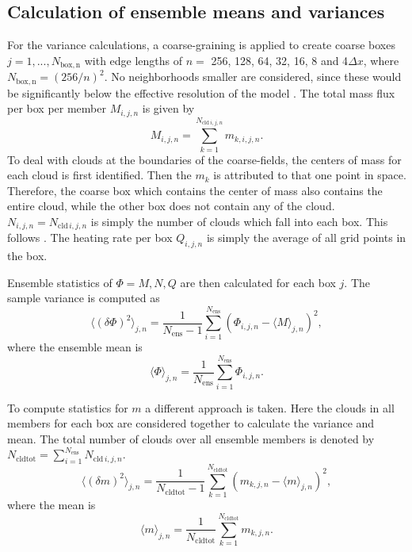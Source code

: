 \documentclass[a4paper, 12pt]{article}
\begin{document}
\subsection{Calculation of ensemble means and variances}
For the variance calculations, a coarse-graining is applied to create coarse boxes $j=1,...,N_{\mathrm{box,n}}$ with edge lengths of $n=$ 256, 128, 64, 32, 16, 8 and 4$\Delta x$, where $N_{\mathrm{box,n}}=(256/n)^2$. No neighborhoods smaller are considered, since these would be significantly below the effective resolution of the model \citep{Skamarock2004}. The total mass flux per box per member $M_{i,j,n}$ is given by
\begin{equation} \label{eq:calc_memM}
 M_{i,j,n} = \sum_{k=1}^{N_{\mathrm{cld}\,i,j,n}} m_{k,i,j,n}.
\end{equation}
To deal with clouds at the boundaries of the coarse-fields, the centers of mass for each cloud is first identified. Then the $m_k$ is attributed to that one point in space. Therefore, the coarse box which contains the center of mass also contains the entire cloud, while the other box does not contain any of the cloud. $N_{i,j,n}=N_{\mathrm{cld}\,i,j,n}$ is simply the number of clouds which fall into each box. This follows \cite{Cohen2006}. The heating rate per box $Q_{i,j,n}$ is simply the average of all grid points in the box.

Ensemble statistics of $\Phi = M, N, Q$ are then calculated for each box $j$. The sample variance is computed as
\begin{equation} \label{eq:calc_varM}
 \langle (\delta \Phi )^2 \rangle_{j,n} = \frac{1}{N_{\mathrm{ens}}-1} \sum_{i=1}^{N_{\mathrm{ens}}} (\Phi_{i,j,n} - \langle M \rangle_{j,n})^2,
\end{equation}
where the ensemble mean is
\begin{equation} \label{eq:calc_meanM}
 \langle \Phi \rangle_{j,n} = \frac{1}{N_{\mathrm{ens}}} \sum_{i=1}^{N_{\mathrm{ens}}} \Phi_{i,j,n}.
\end{equation}

To compute statistics for $m$ a different approach is taken. Here the clouds in all members for each box are considered together to calculate the variance and mean. The total number of clouds over all ensemble members is denoted by $N_{\mathrm{cldtot}} = \sum_{i=1}^{N_{\mathrm{ens}}} N_{\mathrm{cld}\,i,j,n}$.
\begin{equation} \label{eq:calc_varm}
 \langle (\delta m )^2 \rangle_{j,n} = \frac{1}{N_{\mathrm{cldtot}}-1} \sum_{k=1}^{N_{\mathrm{cldtot}}} (m_{k,j,n} - \langle m \rangle_{j,n})^2,
\end{equation}
where the mean is
\begin{equation} \label{eq:calc_meanm}
 \langle m \rangle_{j,n} = \frac{1}{N_{\mathrm{cldtot}}} \sum_{k=1}^{N_{\mathrm{cldtot}}} m_{k,j,n}.
\end{equation}
\end{document}
